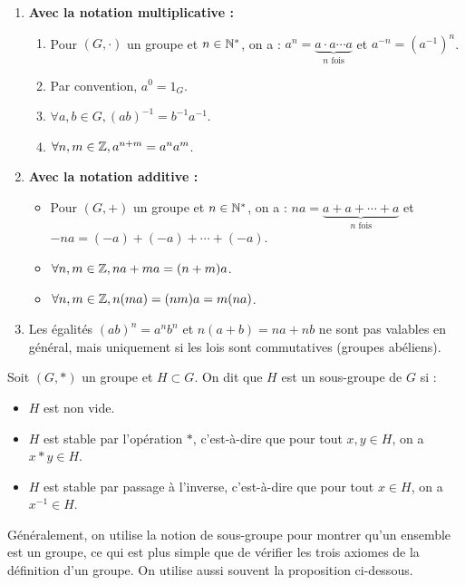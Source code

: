 \documentclass[11pt,a4paper]{report}
\begin{document}
\begin{methodbox}
    \begin{enumerate}
        \item \textbf{Avec la notation multiplicative :}
        \begin{enumerate}
            \item Pour $(G,\cdot)$ un groupe et $n \in \mathbb{N}^*$, on a : $a^n = \underbrace{a \cdot a \cdots a}_{n \text{ fois}}$ et $a^{-n} = (a^{-1})^n$.
            \item Par convention, $a^0 = 1_G$.
            \item $\forall a,b \in G, (ab)^{-1} = b^{-1} a^{-1}$.
            \item $\forall n,m \in \mathbb{Z}, a^{n+m} = a^n a^m$.
        \end{enumerate}
        \item \textbf{Avec la notation additive :}
        \begin{itemize}
            \item Pour $(G,+)$ un groupe et $n \in \mathbb{N}^*$, on a : $n a = \underbrace{a + a + \cdots + a}_{n \text{ fois}}$ et $-n a = (-a) + (-a) + \cdots + (-a)$.
            \item $\forall n,m \in \mathbb{Z}, n a + m a = (n+m) a$.
            \item $\forall n,m \in \mathbb{Z}, n (m a) = (nm) a = m (n a)$.
        \end{itemize}
        \item Les égalités $(ab)^n = a^n b^n$ et $n(a+b) = n a + n b$ ne sont pas valables en général, mais uniquement si les lois sont commutatives (groupes abéliens).
    \end{enumerate}
\end{methodbox}

\begin{definition}
    Soit $(G, *)$ un groupe et $H \subset G$. On dit que $H$ est un sous-groupe de $G$ si :
    \begin{itemize}
        \item $H$ est non vide.
        \item $H$ est stable par l'opération $*$, c'est-à-dire que pour tout $x,y \in H$, on a $x * y \in H$.
        \item $H$ est stable par passage à l'inverse, c'est-à-dire que pour tout $x \in H$, on a $x^{-1} \in H$.
    \end{itemize}
\end{definition}

Généralement, on utilise la notion de sous-groupe pour montrer qu'un ensemble est un groupe, ce qui est plus simple que de vérifier les trois axiomes de la définition d'un groupe. On utilise aussi souvent la proposition ci-dessous.
\end{document}

